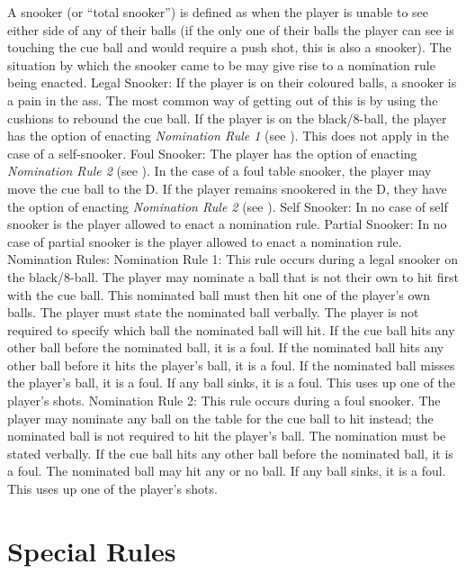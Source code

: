  A snooker (or “total snooker”) is defined as when the player is unable to see either side of any of their balls (if the only one of their balls the player can see is touching the cue ball and would require a push shot, this is also a snooker). The situation by which the snooker came to be may give rise to a nomination rule being enacted.%
 Legal Snooker:%
\subruleitem If the player is on their coloured balls, a snooker is a pain in the ass. The most common way of getting out of this is by using the cushions to rebound the cue ball.%
\subruleitem If the player is on the black/8-ball, the player has the option of enacting \emph{Nomination Rule 1} (see ). This does not apply in the case of a self-snooker.%
 Foul Snooker:%
\subruleitem The player has the option of enacting \emph{Nomination Rule 2} (see ).%
\subruleitem In the case of a foul table snooker, the player may move the cue ball to the D. If the player remains snookered in the D, they have the option of enacting \emph{Nomination Rule 2} (see ).%
 Self Snooker: In no case of self snooker is the player allowed to enact a nomination rule.%
 Partial Snooker: In no case of partial snooker is the player allowed to enact a nomination rule.%
 Nomination Rules:%
Nomination Rule 1: This rule occurs during a legal snooker on the black/8-ball. The player may nominate a ball that is not their own to hit first with the cue ball. This nominated ball must then hit one of the player's own balls. The player must state the nominated ball verbally. The player is not required to specify which ball the nominated ball will hit. If the cue ball hits any other ball before the nominated ball, it is a foul. If the nominated ball hits any other ball before it hits the player's ball, it is a foul. If the nominated ball misses the player's ball, it is a foul. If any ball sinks, it is a foul. This uses up one of the player's shots.%
Nomination Rule 2: This rule occurs during a foul snooker. The player may nominate any ball on the table for the cue ball to hit instead; the nominated ball is not required to hit the player's ball. The nomination must be stated verbally. If the cue ball hits any other ball before the nominated ball, it is a foul. The nominated ball may hit any or no ball. If any ball sinks, it is a foul. This uses up one of the player's shots.%

\section{Special Rules} \label{8ball:special}

